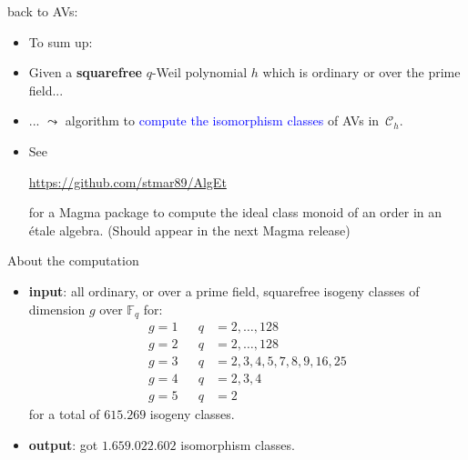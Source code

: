 \documentclass[usenames,dvipsnames,handout]{beamer}
\def\F{\mathbb{F}}
\newcommand{\cC}{{\mathcal C}}
\newcommand{\blue}[1]{\textcolor{blue}{#1}}
\begin{document}
\begin{frame}{ back to AVs: }
    \begin{itemize}
    \item To sum up:
\pause
    \item Given a {\bf squarefree} $q$-Weil polynomial $h$ which is ordinary or over the prime field...
\pause
    \item ... $\leadsto$ algorithm to \blue{compute the isomorphism classes} of AVs in~$\cC_h$.
    \item See
    \begin{center}
        \url{https://github.com/stmar89/AlgEt}
    \end{center}
     for a Magma package to compute the ideal class monoid of an order in an \'etale algebra. (Should appear in the next Magma release) 
    \end{itemize}
\end{frame}

\begin{frame}{ About the computation }
    \begin{itemize}
        \item {\bf input}: all ordinary, or over a prime field, squarefree isogeny classes of dimension $g$ over $\F_q$ for:
        \begin{align*}
            g=1 & & q &=2, \ldots, 128 \\
            g=2 & & q &=2, \ldots, 128 \\
            g=3 & & q &=2, 3, 4, 5, 7, 8, 9, 16, 25 \\
            g=4 & & q &=2, 3, 4 \\
            g=5 & & q &=2  
        \end{align*}
        for a total of $615.269$ isogeny classes.
        \item {\bf output}: got $1.659.022.602$ isomorphism classes.
    \end{itemize}
\end{frame}
\end{document}
